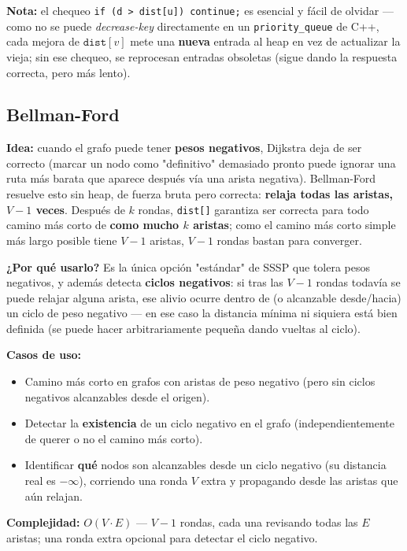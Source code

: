 \documentclass[10pt,a4paper,twocolumn]{article}
\begin{document}
\textbf{Nota:} el chequeo \texttt{if (d > dist[u]) continue;} es
esencial y fácil de olvidar — como no se puede \textit{decrease-key}
directamente en un \texttt{priority\_queue} de C++, cada mejora de
$\texttt{dist}[v]$ mete una \textbf{nueva} entrada al heap en vez de
actualizar la vieja; sin ese chequeo, se reprocesan entradas
obsoletas (sigue dando la respuesta correcta, pero más lento).


\subsection{Bellman-Ford}

\textbf{Idea:} cuando el grafo puede tener \textbf{pesos negativos},
Dijkstra deja de ser correcto (marcar un nodo como "definitivo"
demasiado pronto puede ignorar una ruta más barata que aparece
después vía una arista negativa). Bellman-Ford resuelve esto sin
heap, de fuerza bruta pero correcta: \textbf{relaja todas las
	aristas, $V-1$ veces}. Después de $k$ rondas, \texttt{dist[]}
garantiza ser correcta para todo camino más corto de \textbf{como
	mucho $k$ aristas}; como el camino más corto simple más largo posible
tiene $V-1$ aristas, $V-1$ rondas bastan para converger.

\textbf{¿Por qué usarlo?} Es la única opción "estándar" de SSSP que
tolera pesos negativos, y además detecta \textbf{ciclos negativos}:
si tras las $V-1$ rondas todavía se puede relajar alguna arista, ese
alivio ocurre dentro de (o alcanzable desde/hacia) un ciclo de peso
negativo — en ese caso la distancia mínima ni siquiera está bien
definida (se puede hacer arbitrariamente pequeña dando vueltas al
ciclo).

\textbf{Casos de uso:}

\begin{itemize}
	\item Camino más corto en grafos con aristas de peso negativo
	(pero sin ciclos negativos alcanzables desde el origen).
	\item Detectar la \textbf{existencia} de un ciclo negativo en el
	grafo (independientemente de querer o no el camino más corto).
	\item Identificar \textbf{qué} nodos son alcanzables desde un
	ciclo negativo (su distancia real es $-\infty$), corriendo una
	ronda $V$ extra y propagando desde las aristas que aún relajan.
\end{itemize}

\textbf{Complejidad:} $O(V \cdot E)$ — $V-1$ rondas, cada una
revisando todas las $E$ aristas; una ronda extra opcional para
detectar el ciclo negativo.
\end{document}

